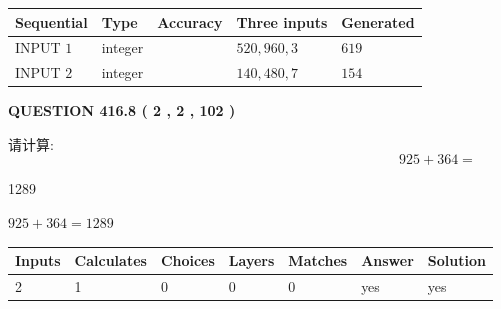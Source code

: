 \documentclass{ctexart}
\begin{document}
  
\noindent\begin{tabular}{|l|l|l|l|l|}
\hline
 Sequential & Type & Accuracy & Three inputs & Generated \\ 
\hline
 
 
  INPUT $  1 $ & integer &  & $
 520
 , 
 960
 , 
 3
 $ & $ 619 $ 
 \\  \hline  
 
 
  INPUT $  2 $ & integer &  & $
 140
 , 
 480
 , 
 7
 $ & $ 154 $ 
 \\  \hline  
 \end{tabular}
   
   
  
\vspace{0.2in}
  
{\textbf{\Large{QUESTION
416.8 
 ( 2 , 2 , 102 )
}}}
  
  
 
请计算:
\begin{equation}
925 +  %
364 = \nonumber
\end{equation}
 
 
 
\noindent{}
 
 

1289
 
 
\noindent{}
 
 

 
 
 
\noindent{}
 
 

$ %
925 +  %
364=   %
1289$
 
 
\noindent{}
 
 

 
   
   
   
   
\noindent\begin{tabular}{|l|l|l|l|l|l|l|}
 \hline
Inputs & Calculates & Choices & Layers & Matches & Answer & Solution \\ \hline
 2  & 
 1  & 
 0
  & 
 0  & 
 0  & 
  yes & 
  yes 
  \\ \hline
 \end{tabular}
   
   
   
\end{document}
